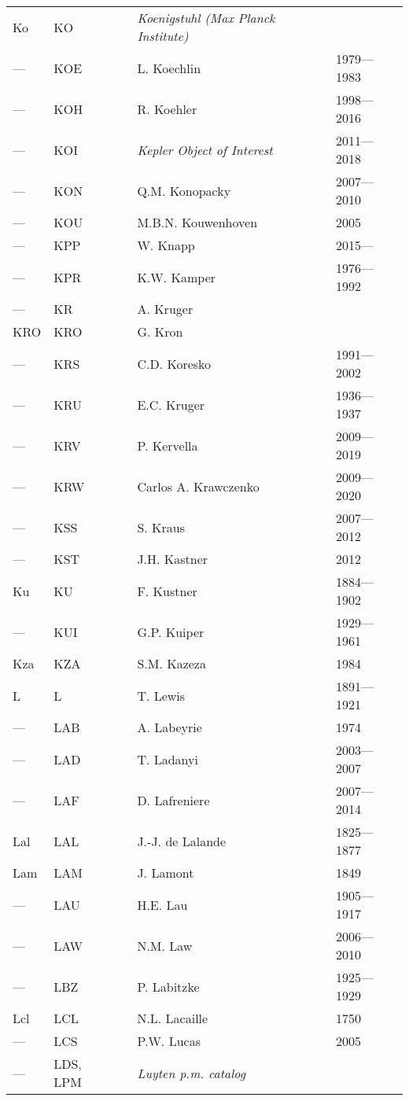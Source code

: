 \begin{longtable}{l|l|c|p{59mm}|l}
Ko  & KO  &   & \emph{Koenigstuhl (Max Planck Institute)} & \\
--- & KOE &   & L. Koechlin & 1979---1983 \\
--- & KOH &   & R. Koehler & 1998---2016 \\
--- & KOI &   & \emph{Kepler Object of Interest} & 2011---2018 \\
--- & KON &   & Q.M. Konopacky & 2007---2010 \\
--- & KOU &   & M.B.N. Kouwenhoven & 2005 \\
--- & KPP &   & W. Knapp & 2015--- \\
--- & KPR &   & K.W. Kamper & 1976---1992 \\
--- & KR  &   & A. Kruger & \\
KRO & KRO &   & G. Kron & \\
--- & KRS &   & C.D. Koresko & 1991---2002 \\
--- & KRU &   & E.C. Kruger & 1936---1937 \\
--- & KRV &   & P. Kervella & 2009---2019 \\
--- & KRW &   & Carlos A. Krawczenko & 2009---2020 \\
--- & KSS &   & S. Kraus & 2007---2012 \\
--- & KST &   & J.H. Kastner & 2012 \\
Ku  & KU  &   & F. Kustner & 1884---1902 \\
--- & KUI &   & G.P. Kuiper & 1929---1961 \\
Kza & KZA &   & S.M. Kazeza & 1984 \\\midrule
L   & L   &   & T. Lewis & 1891---1921 \\
--- & LAB &   & A. Labeyrie & 1974 \\
--- & LAD &   & T. Ladanyi & 2003---2007 \\
--- & LAF &   & D. Lafreniere & 2007---2014 \\
Lal & LAL &   & J.-J. de Lalande & 1825---1877 \\
Lam & LAM &   & J. Lamont & 1849 \\
--- & LAU &   & H.E. Lau & 1905---1917 \\
--- & LAW &   & N.M. Law & 2006---2010 \\
--- & LBZ &   & P. Labitzke & 1925---1929 \\
Lcl & LCL &   & N.L. Lacaille & 1750 \\
--- & LCS &   & P.W. Lucas & 2005 \\
--- & LDS, LPM &   & \emph{Luyten p.m. catalog} & \\

\end{longtable}
